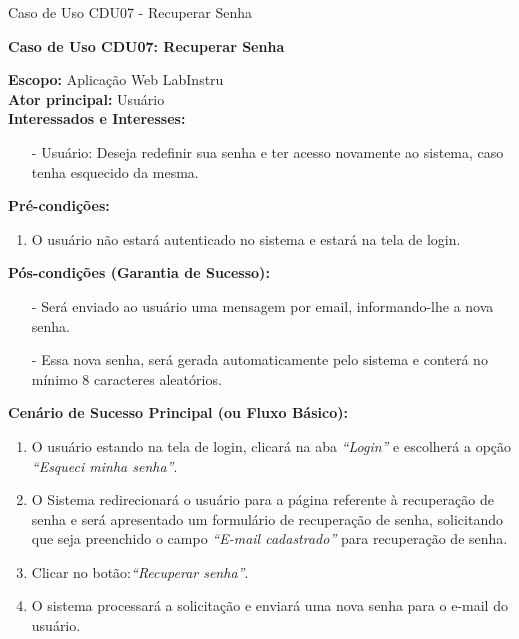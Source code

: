 \begin{quadro}[H]
	\centering
	\caption{Caso de Uso CDU07 - Recuperar Senha}

	\begin{framed}

		\textbf{Caso de Uso CDU07: Recuperar Senha}\\

		\begin{flushleft}

		\textbf{Escopo:} Aplicação Web LabInstru\\

		\textbf{Ator principal:} Usuário\\

		\textbf{Interessados e Interesses:}
		\begin{itemize}
			\item[-] Usuário: Deseja redefinir sua senha e ter acesso novamente ao sistema, caso tenha esquecido da mesma.
		\end{itemize}

		\textbf{Pré-condições:}\\
			 \begin{enumerate}
			 	\item{O usuário não estará autenticado no sistema e estará na tela de login.}
			 \end{enumerate}

		\textbf{Pós-condições (Garantia de Sucesso):}
		\begin{itemize}
			\item[-] Será enviado ao usuário uma mensagem por email, informando-lhe a nova senha.
			\item[-] Essa nova senha, será gerada automaticamente pelo sistema e conterá no mínimo 8 caracteres aleatórios.
		\end{itemize}

		\textbf{Cenário de Sucesso Principal (ou Fluxo Básico):}\\
			\begin{enumerate}
			 	\item{O usuário estando na tela de login, clicará na aba \textit{``Login''} e escolherá a opção \textit{``Esqueci minha senha''}.}
			 	\item{O Sistema redirecionará o usuário para a página referente à recuperação de senha e será apresentado um formulário de recuperação de senha, solicitando que seja preenchido o campo \textit{``E-mail cadastrado''} para recuperação de senha.}
			 	\item{Clicar no botão:\textit{``Recuperar senha''}.}
			 	\item{O sistema processará a solicitação e enviará uma nova senha para o e-mail do usuário.}
			 \end{enumerate}


\end{flushleft}
\end{framed}
\end{quadro}
